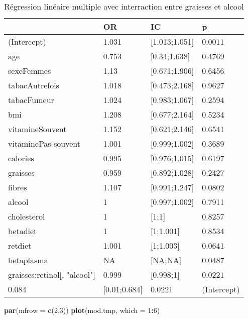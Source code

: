\documentclass[]{article}
\newenvironment{Shaded}{\begin{snugshade}}{\end{snugshade}}
\newcommand{\KeywordTok}[1]{\textcolor[rgb]{0.13,0.29,0.53}{\textbf{#1}}}
\newcommand{\DataTypeTok}[1]{\textcolor[rgb]{0.13,0.29,0.53}{#1}}
\newcommand{\DecValTok}[1]{\textcolor[rgb]{0.00,0.00,0.81}{#1}}
\newcommand{\OperatorTok}[1]{\textcolor[rgb]{0.81,0.36,0.00}{\textbf{#1}}}
\newcommand{\NormalTok}[1]{#1}
\begin{document}
\begin{table}

\caption{\label{tab:unnamed-chunk-89}Régression linéaire multiple avec interraction entre graisses et alcool}
\centering
\begin{tabular}[t]{l|l|l|l}
\hline
  & OR & IC & p\\
\hline
\rowcolor[HTML]{BBD2E1}  (Intercept) & 1.031 & [1.013;1.051] & 0.0011\\
\hline
age & 0.753 & [0.34;1.638] & 0.4769\\
\hline
\rowcolor[HTML]{BBD2E1}  sexeFemmes & 1.13 & [0.671;1.906] & 0.6456\\
\hline
tabacAutrefois & 1.018 & [0.473;2.168] & 0.9627\\
\hline
\rowcolor[HTML]{BBD2E1}  tabacFumeur & 1.024 & [0.983;1.067] & 0.2594\\
\hline
bmi & 1.208 & [0.677;2.164] & 0.5234\\
\hline
\rowcolor[HTML]{BBD2E1}  vitamineSouvent & 1.152 & [0.621;2.146] & 0.6541\\
\hline
vitaminePas-souvent & 1.001 & [0.999;1.002] & 0.3689\\
\hline
\rowcolor[HTML]{BBD2E1}  calories & 0.995 & [0.976;1.015] & 0.6197\\
\hline
graisses & 0.959 & [0.892;1.028] & 0.2427\\
\hline
\rowcolor[HTML]{BBD2E1}  fibres & 1.107 & [0.991;1.247] & 0.0802\\
\hline
alcool & 1 & [0.997;1.002] & 0.7911\\
\hline
\rowcolor[HTML]{BBD2E1}  cholesterol & 1 & [1;1] & 0.8257\\
\hline
betadiet & 1 & [1;1.001] & 0.8534\\
\hline
\rowcolor[HTML]{BBD2E1}  retdiet & 1.001 & [1;1.003] & 0.0641\\
\hline
betaplasma & NA & [NA;NA] & 0.0487\\
\hline
\rowcolor[HTML]{BBD2E1}  graisses:retinol[, "alcool"] & 0.999 & [0.998;1] & 0.0221\\
\hline
0.084 & [0.01;0.684] & 0.0221 & (Intercept)\\
\hline
\end{tabular}
\end{table}

\begin{Shaded}
\begin{Highlighting}[]
\KeywordTok{par}\NormalTok{(}\DataTypeTok{mfrow =} \KeywordTok{c}\NormalTok{(}\DecValTok{2}\NormalTok{,}\DecValTok{3}\NormalTok{))}
\KeywordTok{plot}\NormalTok{(mod.tmp, }\DataTypeTok{which =} \DecValTok{1}\OperatorTok{:}\DecValTok{6}\NormalTok{)}
\end{Highlighting}
\end{Shaded}
\end{document}

